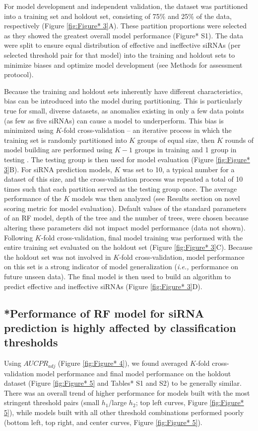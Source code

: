 \documentclass{report}
\begin{document}
 For model development and independent validation, the dataset was partitioned into a training set and holdout set, consisting of 75\% and 25\% of the data, respectively (Figure \ref{fig:Figure* 3}A). These partition proportions were selected as they showed the greatest overall model performance (Figure* S1). The data were split to ensure equal distribution of effective and ineffective siRNAs (per selected threshold pair for that model) into the training and holdout sets to minimize biases and optimize model development (see Methods for assessment protocol).

 Because the training and holdout sets inherently have different characteristics, bias can be introduced into the model during partitioning. This is particularly true for small, diverse datasets, as anomalies existing in only a few data points (as few as five siRNAs) can cause a model to underperform. This bias is minimized using $K$-fold cross-validation – an iterative process in which the training set is randomly partitioned into $K$ groups of equal size, then $K$  rounds of model building are performed using $K-1$ groups in training and 1 group in testing \cite{lachenbruch_estimation_1968}. The testing group is then used for model evaluation (Figure \ref{fig:Figure* 3}B). For siRNA prediction models, $K$ was set to 10, a typical number for a dataset of this size, and the cross-validation process was repeated a total of 10 times such that each partition served as the testing group once. The average performance of the $K$ models was then analyzed (see Results section on novel scoring metric for model evaluation). Default values of the standard parameters of an RF model, depth of the tree and the number of trees, were chosen because altering these parameters did not impact model performance (data not shown). Following $K$-fold cross-validation, final model training was performed with the entire training set evaluated on the holdout set (Figure \ref{fig:Figure* 3}C). Because the holdout set was not involved in $K$-fold cross-validation, model performance on this set is a strong indicator of model generalization (\textit{i.e., }performance on future unseen data). The final model is then used to build an algorithm to predict effective and ineffective siRNAs (Figure \ref{fig:Figure* 3}D). 

\subsection{*Performance of RF model for siRNA prediction is highly affected by classification thresholds}
Using $AUCPR_{adj}$ (Figure \ref{fig:Figure* 4}), we found averaged $K$-fold cross-validation model performance and final model performance on the holdout dataset (Figure \ref{fig:Figure* 5} and Tables* S1 and S2) to be generally similar. There was an overall trend of higher performance for models built with the most stringent threshold pairs (small $h_1$/large $h_2$; top left curves, Figure \ref{fig:Figure* 5}), while models built with all other threshold combinations performed poorly (bottom left, top right, and center curves, Figure \ref{fig:Figure* 5}). 
\end{document}
